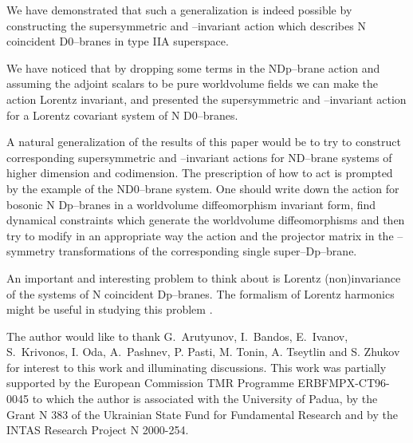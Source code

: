\documentclass[a4paper,12pt]{article}
\begin{document}
We have demonstrated that such a generalization is indeed possible
by constructing the supersymmetric and
\myHighlight{$\kappa$}\coordHE{}--invariant action which describes N coincident D0--branes
in type IIA \coordHE{} superspace.

We have noticed that by dropping some terms in the NDp--brane
action and assuming the \coordHE{} adjoint scalars to be pure
worldvolume fields we can make the action Lorentz invariant, and
presented the supersymmetric and \myHighlight{$\kappa$}\coordHE{}--invariant action for a
Lorentz covariant system of N D0--branes.

A natural generalization of the results of this paper would be
to try to construct corresponding supersymmetric and \myHighlight{$\kappa$}\coordHE{}--invariant
actions for ND--brane systems of higher dimension and codimension.
The prescription of how to act is prompted by the example of the
ND0--brane system. One should write down the action for bosonic N
Dp--branes in a worldvolume diffeomorphism invariant form, find
dynamical constraints which generate the worldvolume
diffeomorphisms and then try to modify in an appropriate way the
action and the projector matrix in the \myHighlight{$\kappa$}\coordHE{}--symmetry transformations
of the corresponding single super--Dp--brane.

An  important and interesting problem to think about is Lorentz
(non)invariance of the systems of N coincident Dp--branes.
The formalism of Lorentz harmonics might be useful in studying this problem
\cite{harm}.

\bigskip
{} The author would like to thank
G.~Arutyunov,  I.~Bandos, E.~Ivanov, S.~Krivonos, I. Oda,
A.~Pashnev, P. Pasti, M. Tonin, A. Tseytlin and S. Zhukov for
interest to this work and illuminating discussions. This work was
partially supported by the European Commission TMR Programme
ERBFMPX-CT96-0045 to which the author is associated with the
University of Padua, by the Grant N 383 of the Ukrainian State
Fund for Fundamental Research and by the INTAS Research Project N
2000-254.
\end{document}
